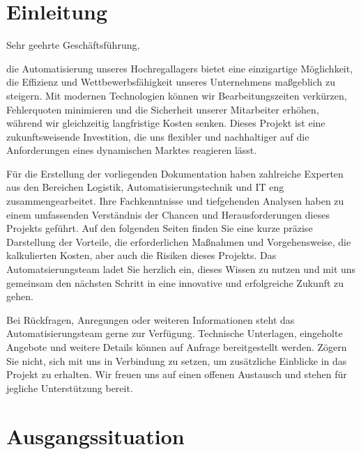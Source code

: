 \chapter{Einleitung}

Sehr geehrte Geschäftsführung,  

die Automatisierung unseres Hochregallagers bietet eine einzigartige Möglichkeit, die Effizienz und Wettbewerbsfähigkeit unseres Unternehmens maßgeblich zu steigern. Mit modernen Technologien können wir Bearbeitungszeiten verkürzen, Fehlerquoten minimieren und die Sicherheit unserer Mitarbeiter erhöhen, während wir gleichzeitig langfristige Kosten senken. Dieses Projekt ist eine zukunftsweisende Investition, die uns flexibler und nachhaltiger auf die Anforderungen eines dynamischen Marktes reagieren lässt.  

Für die Erstellung der vorliegenden Dokumentation haben zahlreiche Experten aus den Bereichen Logistik, Automatisierungstechnik und IT eng zusammengearbeitet. Ihre Fachkenntnisse und tiefgehenden Analysen haben zu einem umfassenden Verständnis der Chancen und Herausforderungen dieses Projekts geführt. Auf den folgenden Seiten finden Sie eine kurze präzise Darstellung der Vorteile, die erforderlichen Maßnahmen und Vorgehensweise, die kalkulierten Kosten, aber auch die Risiken dieses Projekts.  
Das Automatsierungsteam ladet Sie herzlich ein, dieses Wissen zu nutzen und mit uns gemeinsam den nächsten Schritt in eine innovative und erfolgreiche Zukunft zu gehen. 

Bei Rückfragen, Anregungen oder weiteren Informationen steht das Automatisierungsteam gerne zur Verfügung. Technische Unterlagen, eingeholte Angebote und weitere Details können auf Anfrage bereitgestellt werden. Zögern Sie nicht, sich mit uns in Verbindung zu setzen, um zusätzliche Einblicke in das Projekt zu erhalten. Wir freuen uns auf einen offenen Austausch und stehen für jegliche Unterstützung bereit.


\chapter{Ausgangssituation} 

